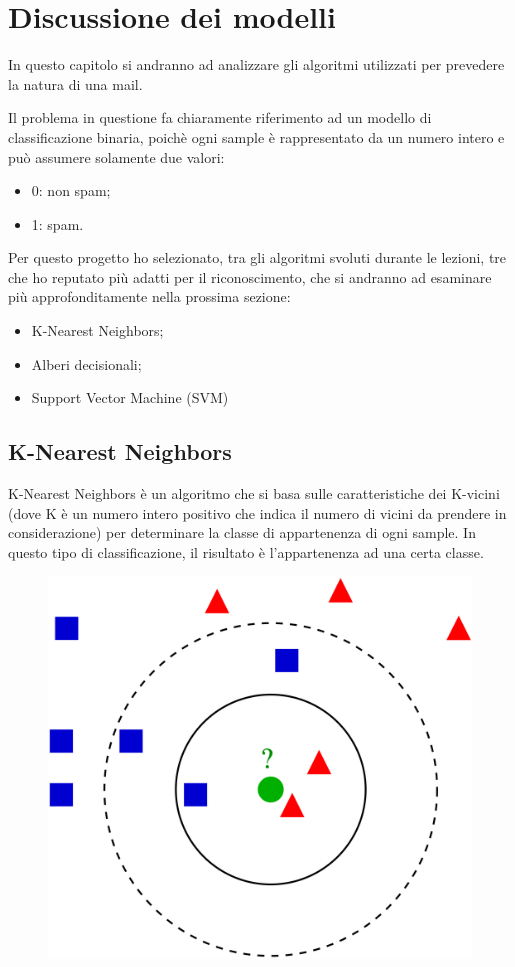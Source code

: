 \documentclass[12pt,a4paper]{article}
\begin{document}
\section{Discussione dei modelli}
In questo capitolo si andranno ad analizzare gli algoritmi utilizzati per prevedere la  natura di una mail.

Il problema in questione fa chiaramente riferimento ad un modello di classificazione binaria, poichè ogni sample è rappresentato da un numero intero e può assumere solamente due valori:
\begin{itemize}
    \item 0: non spam;
    \item 1: spam.
\end{itemize}
Per questo progetto ho selezionato, tra gli algoritmi svoluti durante le lezioni, tre che ho reputato più adatti per il riconoscimento, che si andranno ad esaminare più approfonditamente nella prossima sezione:
\begin{itemize}
    \item K-Nearest Neighbors;
    \item Alberi decisionali;
    \item Support Vector Machine (SVM)
\end{itemize}

\clearpage
\subsection{K-Nearest Neighbors}
K-Nearest Neighbors è un algoritmo che si basa sulle caratteristiche dei K-vicini (dove K è un numero intero positivo che indica il numero di vicini da prendere in considerazione) per determinare la classe di appartenenza di ogni sample.
In questo tipo di classificazione, il risultato è l'appartenenza ad una certa classe.

\begin{figure}[h]
    \centering
    \includegraphics[scale=0.07]{KnnClassification.png}
    \caption{}
\end{figure}
\end{document}
